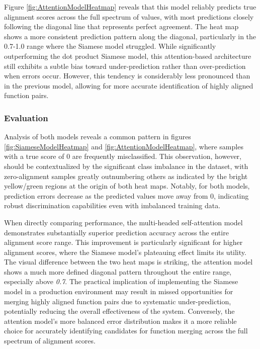 Figure \ref{fig:AttentionModelHeatmap} reveals that this model reliably predicts true alignment scores across the full spectrum of values, with most predictions closely following the diagonal line that represents perfect agreement. The heat map shows a more consistent prediction pattern along the diagonal, particularly in the 0.7-1.0 range where the Siamese model struggled. While significantly outperforming the dot product Siamese model, this attention-based architecture still exhibits a subtle bias toward under-prediction rather than over-prediction when errors occur. However, this tendency is considerably less pronounced than in the previous model, allowing for more accurate identification of highly aligned function pairs.

\subsubsection{Evaluation}

Analysis of both models reveals a common pattern in figures \ref{fig:SiameseModelHeatmap} and \ref{fig:AttentionModelHeatmap}, where samples with a true score of 0 are frequently misclassified. This observation, however, should be contextualized by the significant class imbalance in the dataset, with zero-alignment samples greatly outnumbering others as indicated by the bright yellow/green regions at the origin of both heat maps. Notably, for both models, prediction errors decrease as the predicted values move away from 0, indicating robust discrimination capabilities even with imbalanced training data.

When directly comparing performance, the multi-headed self-attention model demonstrates substantially superior prediction accuracy across the entire alignment score range. This improvement is particularly significant for higher alignment scores, where the Siamese model's plateauing effect limits its utility. The visual difference between the two heat maps is striking, the attention model shows a much more defined diagonal pattern throughout the entire range, especially above \textit{0.7}. The practical implication of implementing the Siamese model in a production environment may result in missed opportunities for merging highly aligned function pairs due to systematic under-prediction, potentially reducing the overall effectiveness of the system. Conversely, the attention model's more balanced error distribution makes it a more reliable choice for accurately identifying candidates for function merging across the full spectrum of alignment scores.

